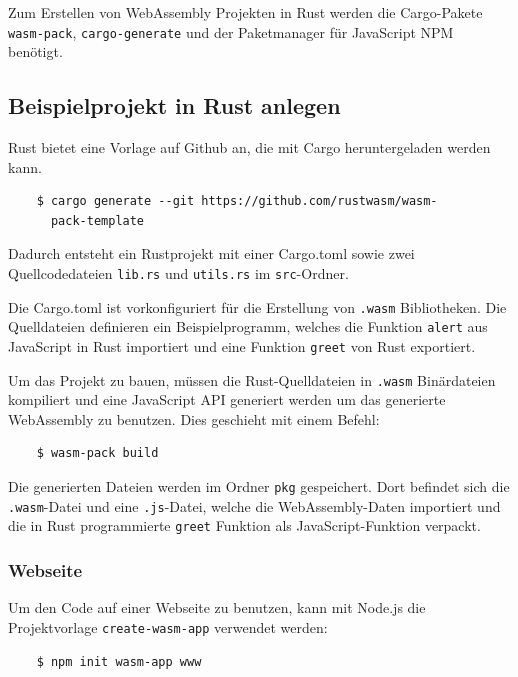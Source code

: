 Zum Erstellen von WebAssembly Projekten in Rust werden die Cargo-Pakete \verb"wasm-pack", \verb"cargo-generate" und der Paketmanager für JavaScript NPM benötigt. \cite{RustWebAssembly}

\subsection{Beispielprojekt in Rust anlegen}

Rust bietet eine Vorlage auf Github an, die mit Cargo heruntergeladen werden kann.

\begin{lstlisting}
    $ cargo generate --git https://github.com/rustwasm/wasm-
      pack-template
\end{lstlisting}

Dadurch entsteht ein Rustprojekt mit einer Cargo.toml sowie zwei Quellcodedateien \verb"lib.rs" und \verb"utils.rs" im \verb"src"-Ordner.

Die Cargo.toml ist vorkonfiguriert für die Erstellung von \verb".wasm" Bibliotheken. Die Quelldateien definieren ein Beispielprogramm, welches die Funktion \verb"alert" aus JavaScript in Rust importiert und eine Funktion \verb"greet" von Rust exportiert.

Um das Projekt zu bauen, müssen die Rust-Quelldateien in \verb".wasm" Binärdateien kompiliert und eine JavaScript API generiert werden um das generierte WebAssembly zu benutzen. Dies geschieht mit einem Befehl:

\begin{lstlisting}
    $ wasm-pack build
\end{lstlisting}

Die generierten Dateien werden im Ordner \verb"pkg" gespeichert. Dort befindet sich die \verb".wasm"-Datei und eine \verb".js"-Datei, welche die WebAssembly-Daten importiert und die in Rust programmierte \verb"greet" Funktion als JavaScript-Funktion verpackt.

\subsubsection{Webseite}

Um den Code auf einer Webseite zu benutzen, kann mit Node.js die Projektvorlage \verb"create-wasm-app" verwendet werden:

\begin{lstlisting}
    $ npm init wasm-app www
\end{lstlisting}

